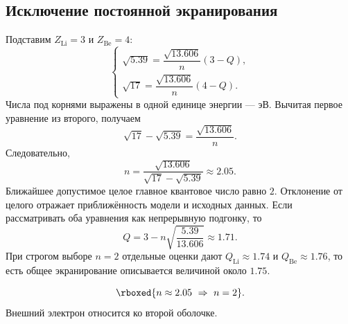 \documentclass[../final.tex]{subfiles}
\begin{document}
\subsection*{Исключение постоянной экранирования}
Подставим $Z_{\mathrm{Li}}=3$ и $Z_{\mathrm{Be}}=4$:
\[
    \begin{cases}
        \sqrt{5.39}=\dfrac{\sqrt{13.606}}n(3-Q),\\[0.6em]
        \sqrt{17}=\dfrac{\sqrt{13.606}}n(4-Q).
    \end{cases}
\]
Числа под корнями выражены в одной единице энергии --- эВ.
Вычитая первое уравнение из второго, получаем
\[
    \sqrt{17}-\sqrt{5.39}=\frac{\sqrt{13.606}}n.
\]
Следовательно,
\[
    n=\frac{\sqrt{13.606}}{\sqrt{17}-\sqrt{5.39}}
      \approx2.05.
\]
Ближайшее допустимое целое главное квантовое число равно $2$.
Отклонение от целого отражает приближённость модели и исходных данных.
Если рассматривать оба уравнения как непрерывную подгонку, то
\[
    Q=3-n\sqrt{\frac{5.39}{13.606}}\approx1.71.
\]
При строгом выборе $n=2$ отдельные оценки дают
$Q_{\mathrm{Li}}\approx1.74$ и $Q_{\mathrm{Be}}\approx1.76$,
то есть общее экранирование описывается величиной около $1.75$.

\answer
\[
    \rboxed{n\approx2.05\ \Rightarrow\ n=2}.
\]
Внешний электрон относится ко второй оболочке.

\endgroup
\end{document}
